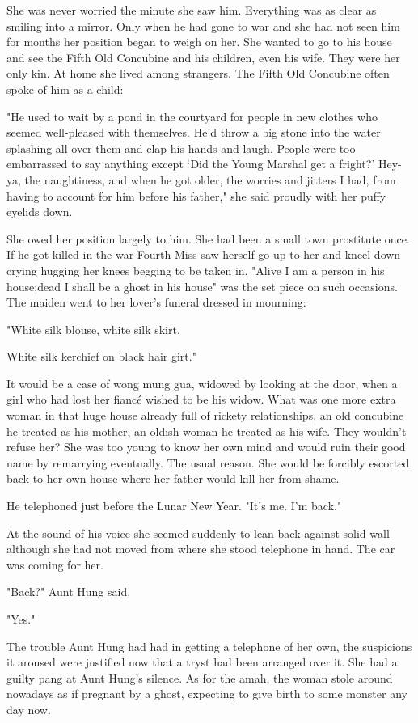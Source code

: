 \par She was never worried the minute she saw him. Everything was as clear as smiling into a mirror. Only when he had gone to war and she had not seen him for months her position began to weigh on her. She wanted to go to his house and see the Fifth Old Concubine and his children, even his wife. They were her only kin. At home she lived among strangers. The Fifth Old Concubine often spoke of him as a child:
\par "He used to wait by a pond in the courtyard for people in new clothes who seemed well-pleased with themselves. He'd throw a big stone into the water splashing all over them and clap his hands and laugh. People were too embarrassed to say anything except ‘Did the Young Marshal get a fright?' Hey-ya, the naughtiness, and when he got older, the worries and jitters I had, from having to account for him before his father," she said proudly with her puffy eyelids down.
\par She owed her position largely to him. She had been a small town prostitute once. If he got killed in the war Fourth Miss saw herself go up to her and kneel down crying hugging her knees begging to be taken in. "Alive I am a person in his house;dead I shall be a ghost in his house" was the set piece on such occasions. The maiden went to her lover's funeral dressed in mourning:
\par "White silk blouse, white silk skirt,
\par White silk kerchief on black hair girt."
\par It would be a case of wong mung gua, widowed by looking at the door, when a girl who had lost her fiancé wished to be his widow. What was one more extra woman in that huge house already full of rickety relationships, an old concubine he treated as his mother, an oldish woman he treated as his wife. They wouldn't refuse her? She was too young to know her own mind and would ruin their good name by remarrying eventually. The usual reason. She would be forcibly escorted back to her own house where her father would kill her from shame.
\par He telephoned just before the Lunar New Year. "It's me. I'm back."
\par At the sound of his voice she seemed suddenly to lean back against solid wall although she had not moved from where she stood telephone in hand. The car was coming for her.
\par "Back?" Aunt Hung said.
\par "Yes."
\par The trouble Aunt Hung had had in getting a telephone of her own, the suspicions it aroused were justified now that a tryst had been arranged over it. She had a guilty pang at Aunt Hung's silence. As for the amah, the woman stole around nowadays as if pregnant by a ghost, expecting to give birth to some monster any day now.
